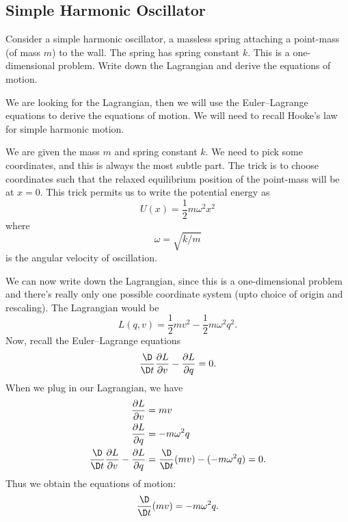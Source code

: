 \subsection{Simple Harmonic Oscillator}

Consider a simple harmonic oscillator, a massless spring attaching a
point-mass (of mass $m$) to the wall. The spring has spring constant $k$.
This is a one-dimensional problem. Write down the Lagrangian and derive
the equations of motion.

We are looking for the Lagrangian, then we will use the Euler--Lagrange
equations to derive the equations of motion. We will need to recall
Hooke's law for simple harmonic motion.

We are given the mass $m$ and spring constant $k$. We need to pick some
coordinates, and this is always the most subtle part. The trick is to
choose coordinates such that the relaxed equilibrium position of the
point-mass will be at $x=0$. This trick permits us to write the
potential energy as
\begin{equation}
U(x) = \frac{1}{2}m\omega^{2}x^{2}
\end{equation}
where
\begin{equation}
\omega = \sqrt{k/m}
\end{equation}
is the angular velocity of oscillation.

We can now write down the Lagrangian, since this is a one-dimensional
problem and there's really only one possible coordinate system (upto
choice of origin and rescaling). The Lagrangian would be
\begin{equation}
L(q,v) = \frac{1}{2}mv^{2} - \frac{1}{2}m\omega^{2}q^{2}.
\end{equation}
Now, recall the Euler--Lagrange equations
\begin{equation}
\frac{\D}{\D t}\frac{\partial L}{\partial v} - \frac{\partial L}{\partial q} = 0.
\end{equation}
When we plug in our Lagrangian, we have
\begin{subequations}
\begin{align}
\frac{\partial L}{\partial v} &= mv\\
\frac{\partial L}{\partial q} &= -m\omega^{2}q\\
\frac{\D}{\D t}\frac{\partial L}{\partial v} - \frac{\partial L}{\partial q} 
&=\frac{\D}{\D t}(mv) - (-m\omega^{2}q) = 0.
\end{align}
\end{subequations}
Thus we obtain the equations of motion:
\begin{equation}\label{006-lagrangian:eom:spring}
\frac{\D}{\D t}(mv) = -m\omega^{2}q.
\end{equation}

